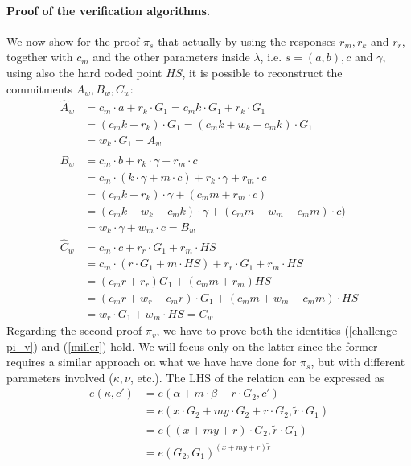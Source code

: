 \documentclass[twocolumn]{article}
\begin{document}
\paragraph{Proof of the verification algorithms.} We now show for the proof $\pi_s$ that actually by using the responses $r_m, r_k$ and $r_r$, together with $c_m$ and the other parameters inside $\lambda$, i.e. $s=(a,b), c$ and $\gamma$, using also the hard coded point $HS$, it is possible to reconstruct the commitments $A_w, B_w, C_w$:
\begin{align*}
    \widehat{A}_w   &= c_m\cdot a + r_k\cdot G_1 = c_m k \cdot G_1 + r_k \cdot G_1 \\
                    &= (c_m k + r_k)\cdot G_1 = (c_m k + w_k - c_m k)\cdot G_1 \\
                    &= w_k\cdot G_1 = A_w \\
    \widehat{B}_w   &= c_m\cdot b + r_k\cdot \gamma + r_m\cdot c \\
                    &= c_m\cdot (k\cdot \gamma + m\cdot c) + r_k\cdot\gamma + r_m\cdot c \\
                    &= (c_m k + r_k) \cdot\gamma + (c_m m + r_m\cdot c) \\
                    &= (c_m k + w_k - c_m k ) \cdot\gamma + (c_m m + w_m - c_m m)\cdot c) \\
                    &= w_k\cdot\gamma + w_m\cdot c = B_w \\
    \widehat{C}_w   &= c_m\cdot c + r_r\cdot G_1 + r_m\cdot HS \\
    &= c_m\cdot (r\cdot G_1 + m\cdot HS) + r_r\cdot G_1 + r_m\cdot HS \\
                    &= (c_m r + r_r) G_1 + (c_m m + r_m) HS \\
                    &= (c_m r + w_r - c_m r)\cdot G_1 + (c_m m + w_m - c_m m)\cdot HS \\
                    &= w_r \cdot G_1 + w_m\cdot HS = C_w
\end{align*} 
Regarding the second proof $\pi_v$, we have to prove both the identities (\ref{challenge pi_v}) and (\ref{miller}) hold. We will focus only on the latter since the former requires a similar approach on what we have have done for $\pi_s$, but with different parameters involved ($\kappa, \nu$, etc.). The LHS of the relation can be expressed as
\begin{align*}
    e(\kappa, c') &= e(\alpha + m\cdot\beta + r\cdot G_2, c') \\
    &= e(x\cdot G_2 + my\cdot G_2  + r\cdot G_2,\tilde{r}\cdot G_1) \\
    &= e((x+my+r)\cdot G_2, \tilde{r}\cdot G_1) \\
    &= e(G_2,G_1)^{(x+my+r)\tilde{r}}
\end{align*}
\end{document}
